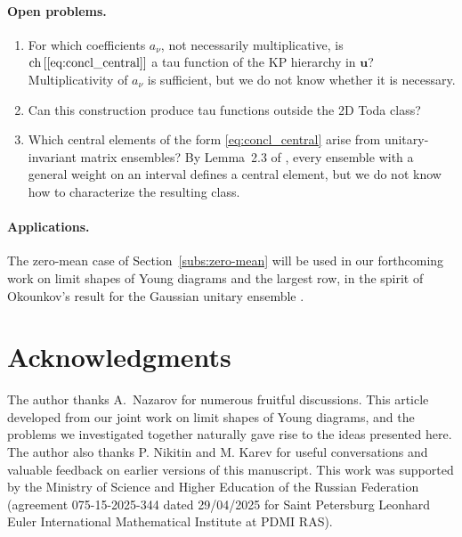 \documentclass{article}
\theoremstyle{plain}
\theoremstyle{definition}
\numberwithin{equation}{section}
\begin{document}
\paragraph{Open problems.}
\begin{enumerate}
    \item For which coefficients $a_\nu$, not necessarily multiplicative, is
    $\mathrm{ch}\,[\eqref{eq:concl_central}]$ a tau function of the KP
    hierarchy in $\mathbf u$? Multiplicativity of $a_\nu$ is sufficient, but we do
    not know whether it is necessary.
    \item Can this construction produce tau functions outside the 2D Toda
    class? 
    \item Which central elements of the form \eqref{eq:concl_central} arise
    from unitary-invariant matrix ensembles? By Lemma~2.3 of
    \cite{gisonni2021jacobi}, every ensemble with a general weight on an
    interval defines a central element, but we do not know how to
    characterize the resulting class.
\end{enumerate}

\paragraph{Applications.}
The zero-mean case of Section~\ref{subs:zero-mean} will be used in our forthcoming work on
limit shapes of Young diagrams and the largest row, in the spirit of
Okounkov's result for the Gaussian unitary ensemble \cite{okounkov2000random}.

\section*{Acknowledgments}
The author thanks A.~Nazarov for numerous fruitful discussions. This article developed from our joint work on limit shapes of Young diagrams, and the problems we investigated together naturally gave rise to the ideas presented here. The author also thanks P. Nikitin and M. Karev for useful conversations and valuable feedback on earlier versions of this manuscript. This work was supported by the Ministry of Science and Higher Education of the Russian Federation (agreement 075-15-2025-344 dated 29/04/2025 for Saint Petersburg Leonhard Euler International Mathematical Institute at PDMI RAS).



\end{document}
